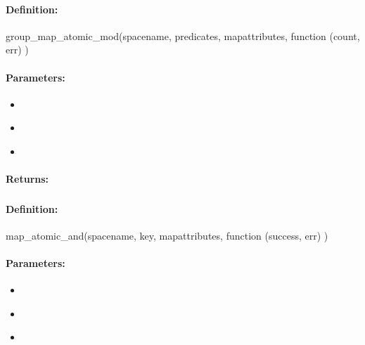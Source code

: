 \paragraph{Definition:}
\begin{javascriptcode}
group_map_atomic_mod(spacename, predicates, mapattributes, function (count, err) {})
\end{javascriptcode}
\paragraph{Parameters:}
\begin{itemize}[noitemsep]
\item {}\\

\item {}\\

\item {}\\

\end{itemize}

\paragraph{Returns:}


\pagebreak
\subsubsection{}
\label{api:nodejs:map_atomic_and}


\paragraph{Definition:}
\begin{javascriptcode}
map_atomic_and(spacename, key, mapattributes, function (success, err) {})
\end{javascriptcode}
\paragraph{Parameters:}
\begin{itemize}[noitemsep]
\item {}\\

\item {}\\

\item {}\\

\end{itemize}

